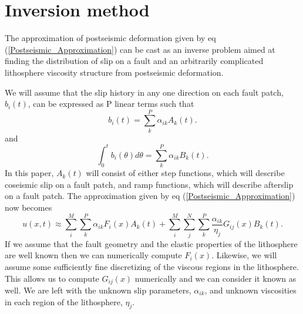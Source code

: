 \documentclass[12pt]{article}
\begin{document}
\section{Inversion method}
The approximation of postseismic deformation given by eq
(\ref{Postseismic_Approximation}) can be cast as an inverse problem
aimed at finding the distribution of slip on a fault and an
arbitrarily complicated lithosphere viscosity structure from
postseismic deformation.
  
We will assume that the slip history in any one direction on each
fault patch, $b_i(t)$, can be expressed as P linear terms such that
\begin{equation}
  b_i(t) = \sum_k^P \alpha_{ik}A_k(t) .
\end{equation}
and
\begin{equation}
  \int_0^t b_i(\theta)d\theta = \sum_k^P\alpha_{ik}B_k(t) .
\end{equation}
In this paper, $A_k(t)$ will consist of either step functions, which
will describe coseismic slip on a fault patch, and ramp functions,
which will describe afterslip on a fault patch.  The approximation
given by eq (\ref{Postseismic_Approximation}) now becomes
\begin{equation}\label{Postseismic_Approximation2}
u(x,t) \approx \sum_i^M\sum_k^P\alpha_{ik}F_i(x)A_k(t) + 
               \sum_i^M\sum_j^N\sum_k^P\frac{\alpha_{ik}}{\eta_j}G_{ij}(x)B_k(t).
\end{equation}
If we assume that the fault geometry and the elastic properties of the
lithosphere are well known then we can numerically compute
$F_i(x)$. Likewise, we will assume some sufficiently fine discretizing
of the viscous regions in the lithosphere. This allows us to compute
$G_{ij}(x)$ numerically and we can consider it known as well.  We are
left with the unknown slip parameters, $\alpha_{ik}$, and unknown
viscosities in each region of the lithosphere, $\eta_j$.
\end{document}
